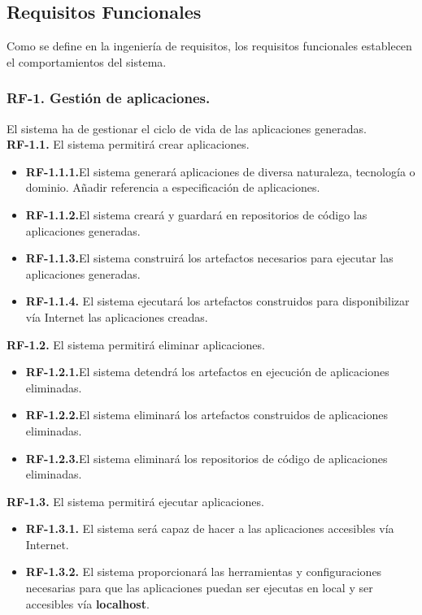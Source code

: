 \documentclass[a4paper,11pt]{book}
\begin{document}
\subsection{Requisitos Funcionales }
Como se define en la ingeniería de requisitos, los requisitos funcionales establecen el comportamientos del sistema.\\



\subsubsection { \textbf{ RF-1. Gestión de aplicaciones.}} El sistema ha de gestionar el ciclo de vida de las aplicaciones generadas.\\

\textbf{RF-1.1.} El sistema permitirá crear aplicaciones.
\begin{itemize}
 \item 	\textbf{RF-1.1.1.}El sistema generará aplicaciones de diversa naturaleza, tecnología o dominio. Añadir referencia a especificación de aplicaciones.
 \item 	\textbf{RF-1.1.2.}El sistema creará y  guardará en repositorios de código las aplicaciones generadas.
  \item \textbf{RF-1.1.3.}El sistema construirá los artefactos necesarios para ejecutar las aplicaciones generadas.
   \item  \textbf{RF-1.1.4.} El sistema ejecutará los artefactos construidos para disponibilizar vía Internet las aplicaciones creadas. \\
\end{itemize}


\textbf{RF-1.2.} El sistema permitirá eliminar aplicaciones.
\begin{itemize}
 \item 	\textbf{RF-1.2.1.}El sistema detendrá los artefactos en ejecución de aplicaciones eliminadas.
  \item 	\textbf{RF-1.2.2.}El sistema eliminará los artefactos construidos de aplicaciones eliminadas.
   \item  \textbf{RF-1.2.3.}El sistema eliminará los repositorios de código de aplicaciones eliminadas.	\\
\end{itemize}


\textbf{RF-1.3.} El sistema permitirá ejecutar aplicaciones.
\begin{itemize}
 \item \textbf{RF-1.3.1.} El sistema será capaz de hacer a las aplicaciones accesibles vía Internet.
 \item  \textbf{RF-1.3.2.} El sistema proporcionará las herramientas  y configuraciones necesarias para que las aplicaciones puedan ser ejecutas en local y ser accesibles vía \textbf{localhost}.  \\
\end{itemize}
\end{document}
